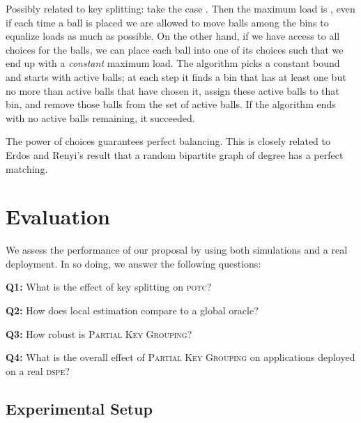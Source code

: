 \documentclass[10pt,conference,letterpaper]{IEEEtran}
\newenvironment {squishlist}
{\begin{list}{}
  { \setlength{\itemsep}{1pt}
     \setlength{\parsep}{1pt}
     \setlength{\topsep}{1pt}
     \setlength{\partopsep}{1pt}
     \setlength{\leftmargin}{1.5em}
     \setlength{\labelwidth}{1em}
     \setlength{\labelsep}{0.5em} } }
{\end{list}}
\newcommand{\potc}{\textsc{p\textup{o}tc}\xspace}
\newcommand{\dspe}{\textsc{dspe}\xspace}
\newcommand{\pkg}{\textsc{Partial Key Grouping}\xspace}
\begin{document}
{Possibly related to key splitting: take the case . Then the maximum load is
 , even if each time a ball is placed we are allowed to move balls among the  bins to equalize loads as much as possible.
 On the other hand, if we have access to all  choices for the  balls, we can place each ball into one of its choices such that we end up with
 a \emph{constant} maximum load. The algorithm picks a constant bound  and starts with  active balls; at each step it finds a bin that has at
 least one but no more than  active balls that have chosen it, assign these active balls to that bin, and remove those balls from the set of active
 balls. If the algorithm ends with no active balls remaining, it succeeded.

The power of  choices guarantees perfect balancing. This is closely related to Erdos and Renyi's result that a random bipartite graph of degree 
has a perfect matching.
}

 \section{Evaluation}
\label{sec:evaluation}

We assess the performance of our proposal by using both simulations and a real deployment.
In so doing, we answer the following questions:
\begin{squishlist}
\item[\textbf{Q1:}]
What is the effect of key splitting on \potc?
\item[\textbf{Q2:}]
How does local estimation compare to a global oracle?
\item[\textbf{Q3:}]
How robust is \pkg? \item[\textbf{Q4:}]
What is the overall effect of \pkg on applications deployed on a real \dspe?
\end{squishlist}



\subsection{Experimental Setup}
\end{document}
